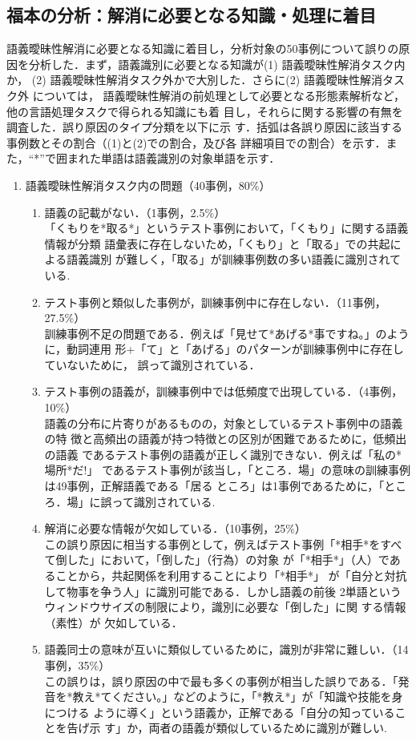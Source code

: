 \documentclass[japanese]{jnlp_1.4}
\begin{document}
\subsection{福本の分析：解消に必要となる知識・処理に着目}

語義曖昧性解消に必要となる知識に着目し，分析対象の50事例について誤りの原
因を分析した．まず，語義識別に必要となる知識が(1) 語義曖昧性解消タスク内か，
(2) 語義曖昧性解消タスク外かで大別した．さらに(2) 語義曖昧性解消タスク外 については，
語義曖昧性解消の前処理として必要となる形態素解析など，他の言語処理タスクで得られる知識にも着
目し，それらに関する影響の有無を調査した．誤り原因のタイプ分類を以下に示
す．括弧は各誤り原因に該当する事例数とその割合（(1)と(2)での割合，及び各
詳細項目での割合）を示す．また，``*''で囲まれた単語は語義識別の対象単語を示す．

\begin{enumerate}
\item 語義曖昧性解消タスク内の問題（40事例，80\%）

\begin{enumerate}
\item 語義の記載がない．（1事例，2.5\%）\\
「くもりを*取る*」というテスト事例において，「くもり」に関する語義情報が分類
      語彙表に存在しないため，「くもり」と「取る」での共起による語義識別
      が難しく，「取る」が訓練事例数の多い語義に識別されている.
\item  テスト事例と類似した事例が，訓練事例中に存在しない．（11事例，27.5\%）\\
訓練事例不足の問題である．例えば「見せて*あげる*事ですね。」のように，動詞連用
       形+「て」と「あげる」のパターンが訓練事例中に存在していないために，
       誤って識別されている．
\item テスト事例の語義が，訓練事例中では低頻度で出現している．（4事例，10\%）\\
語義の分布に片寄りがあるものの，対象としているテスト事例中の語義の特
      徴と高頻出の語義が持つ特徴との区別が困難であるために，低頻出の語義
      であるテスト事例の語義が正しく識別できない．例えば「私の*場所*だ!」
      であるテスト事例が該当し，「ところ．場」の意味の訓練事例は49事例，正解語義である「居る
      ところ」は1事例であるために，「ところ．場」に誤って識別されている.
\item 解消に必要な情報が欠如している．（10事例，25\%）\\
この誤り原因に相当する事例として，例えばテスト事例「*相手*をすべて倒した」において，「倒した」（行為）の対象
      が「*相手*」（人）であることから，共起関係を利用することにより「*相手*」
      が「自分と対抗して物事を争う人」に識別可能である．しかし語義の前後
      2単語というウィンドウサイズの制限により，識別に必要な「倒した」に関
      する情報（素性）が
欠如している．
\item 語義同士の意味が互いに類似しているために，識別が非常に難しい．（14事例，35\%）\\
この誤りは，誤り原因の中で最も多くの事例が相当した誤りである．「発
      音を*教え*てください。」などのように，「*教え*」が「知識や技能を身につける
      ように導く」という語義か，正解である「自分の知っていることを告げ示
      す」か，両者の語義が類似しているために識別が難しい.
\end{enumerate}


\end{enumerate}
\end{document}
